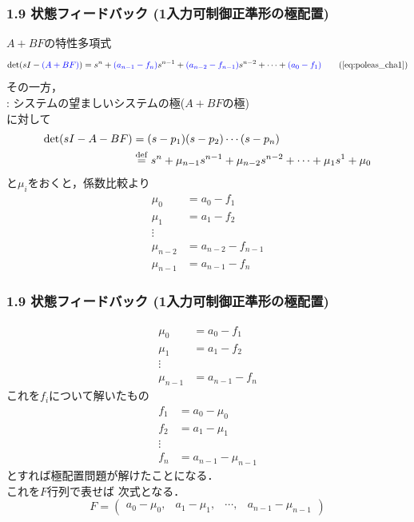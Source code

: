 \begin{frame}[t]
\frametitle{1.9 状態フィードバック (1入力可制御正準形の極配置)}
$A+BF$の特性多項式
\begin{equation}
 \det (sI-\Blue{(A+BF)}) = s^n + \Blue{(a_{n-1}-f_n)} s^{n-1}
  + \Blue{(a_{n-2}-f_{n-1})} s^{n-2} + \cdots 
  + \Blue{(a_0-f_1)}
\tag{\ref{eq:poleas_cha1}}
\end{equation}
その一方，\\
 : システムの望ましいシステムの極($A+BF$の極)\\
に対して
\begin{align}
 \mathop{\rm det}\nolimits (s I - A - B F)
 &= (s - p_1)(s - p_2) \cdots (s - p_n) \nonumber \\
 &\stackrel{\rm def}{=} s^n + \mu_{n-1} s^{n-1} + \mu_{n-2} s^{n-2}
  + \cdots + \mu_1 s^1 + \mu_0
\label{eq:poleas_cha2}
\end{align}
と$\mu_i$をおくと，係数比較より
\begin{align}
 \mu_0 & = a_0-f_1    \nonumber\\
 \mu_{1} & = a_1-f_2  \nonumber\\
 \vdots \\
 \mu_{n-2} & = a_{n-2}-f_{n-1} \nonumber\\
 \mu_{n-1} & = a_{n-1}-f_n    \nonumber
\end{align}
\end{frame}


\begin{frame}[t]
\frametitle{1.9 状態フィードバック (1入力可制御正準形の極配置)}
\vspace*{-5mm}

\begin{align}
 \mu_0 & = a_0-f_1    \nonumber\\
 \mu_{1} & = a_1-f_2  \nonumber\\
 \vdots \\
 \mu_{n-1} & = a_{n-1}-f_n    \nonumber
\end{align}
これを$f_i$について解いたもの
\begin{align}
 f_1 & = a_0-\mu_0
\nonumber\\
 f_2 & = a_1-\mu_{1}
\nonumber\\
 \vdots
\nonumber\\
 f_n& = a_{n-1}-\mu_{n-1}
\nonumber
\end{align}
とすれば極配置問題が解けたことになる．\\
これを$F$行列で表せば
次式となる．
\begin{equation}
 {F} = \left(\begin{array}{cccc}
            a_0-\mu_0, & a_1-\mu_1, & \cdots, & a_{n-1}-\mu_{n-1}
     \end{array}\right)
\end{equation}

\end{frame}


